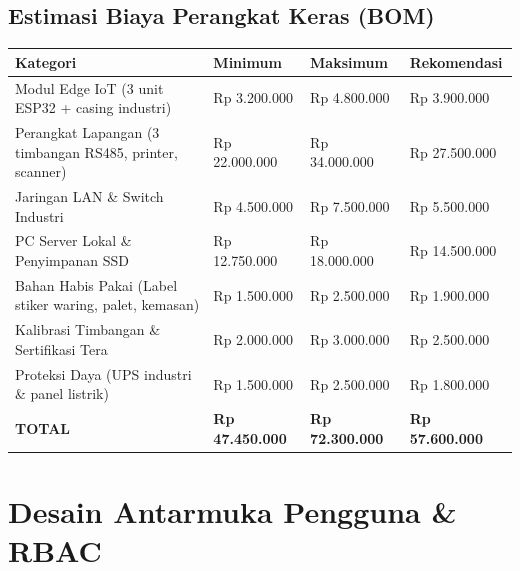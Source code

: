\documentclass[12pt,a4paper]{article}
\begin{document}
\subsection{Estimasi Biaya Perangkat Keras (BOM)}
\begin{longtable}{@{}>{\raggedright\arraybackslash}p{5.4cm}>{\raggedright\arraybackslash}p{2.6cm}>{\raggedright\arraybackslash}p{2.6cm}>{\raggedright\arraybackslash}p{2.6cm}@{}}
\toprule
\textbf{Kategori} & \textbf{Minimum} & \textbf{Maksimum} & \textbf{Rekomendasi} \\
\midrule
\endhead
Modul Edge IoT (3 unit ESP32 + casing industri) & Rp 3.200.000 & Rp 4.800.000 & Rp 3.900.000 \\
Perangkat Lapangan (3 timbangan RS485, printer, scanner) & Rp 22.000.000 & Rp 34.000.000 & Rp 27.500.000 \\
Jaringan LAN \& Switch Industri & Rp 4.500.000 & Rp 7.500.000 & Rp 5.500.000 \\
PC Server Lokal \& Penyimpanan SSD & Rp 12.750.000 & Rp 18.000.000 & Rp 14.500.000 \\
Bahan Habis Pakai (Label stiker waring, palet, kemasan) & Rp 1.500.000 & Rp 2.500.000 & Rp 1.900.000 \\
Kalibrasi Timbangan \& Sertifikasi Tera & Rp 2.000.000 & Rp 3.000.000 & Rp 2.500.000 \\
Proteksi Daya (UPS industri \& panel listrik) & Rp 1.500.000 & Rp 2.500.000 & Rp 1.800.000 \\
\midrule
\textbf{TOTAL} & \textbf{Rp 47.450.000} & \textbf{Rp 72.300.000} & \textbf{Rp 57.600.000} \\
\bottomrule
\end{longtable}

\section{Desain Antarmuka Pengguna \& RBAC}
\end{document}
